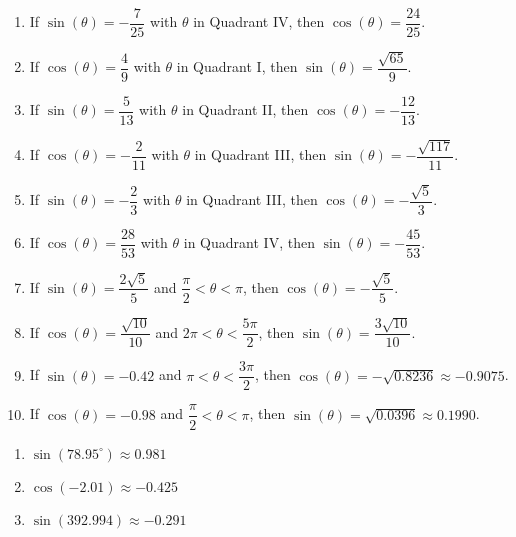 \documentclass{ximera}
\begin{document}
\begin{enumerate}

\setcounter{enumi}{\value{HW}}

\item If $\sin(\theta) = -\dfrac{7}{25}$ with $\theta$ in Quadrant IV, then $\cos(\theta) = \dfrac{24}{25}$.
\item If $\cos(\theta) = \dfrac{4}{9}$ with $\theta$ in Quadrant I, then $\sin(\theta) = \dfrac{\sqrt{65}}{9}$.
\item If $\sin(\theta) = \dfrac{5}{13}$ with $\theta$ in Quadrant II, then $\cos(\theta) = -\dfrac{12}{13}$.
\item If $\cos(\theta) = -\dfrac{2}{11}$ with $\theta$ in Quadrant III, then $\sin(\theta) = -\dfrac{\sqrt{117}}{11}$.
\item If $\sin(\theta) = -\dfrac{2}{3}$ with $\theta$ in Quadrant III, then $\cos(\theta) = -\dfrac{\sqrt{5}}{3}$.
\item If $\cos(\theta) = \dfrac{28}{53}$ with $\theta$ in Quadrant IV, then $\sin(\theta) = -\dfrac{45}{53}$.
\item  If $\sin(\theta) = \dfrac{2\sqrt{5}}{5}$ and $\dfrac{\pi}{2} < \theta < \pi$, then $\cos(\theta) = -\dfrac{\sqrt{5}}{5}$.
\item  If $\cos(\theta) = \dfrac{\sqrt{10}}{10}$ and $2\pi < \theta < \dfrac{5\pi}{2}$, then $\sin(\theta)  = \dfrac{3 \sqrt{10}}{10}$.
\item  If $\sin(\theta) = -0.42$ and $\pi < \theta < \dfrac{3\pi}{2}$, then $\cos(\theta) = -\sqrt{0.8236} \approx -0.9075$.
\item  If $\cos(\theta) = -0.98$ and $\dfrac{\pi}{2} < \theta < \pi$, then $\sin(\theta) = \sqrt{0.0396} \approx 0.1990$.

\setcounter{HW}{\value{enumi}}

\end{enumerate}


\begin{multicols}{3}

\begin{enumerate}

\setcounter{enumi}{\value{HW}}

\item $\sin(78.95^{\circ}) \approx 0.981$
\item $\cos(-2.01) \approx -0.425$
\item $\sin(392.994) \approx -0.291$

\setcounter{HW}{\value{enumi}}

\end{enumerate}

\end{multicols}
\end{document}
